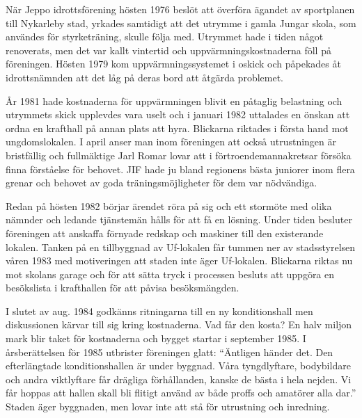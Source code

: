%



%
När Jeppo idrottsförening hösten 1976 beslöt att överföra ägandet av sportplanen till Nykarleby stad, yrkades samtidigt att det utrymme i gamla Jungar skola, som användes för styrketräning, skulle följa med. Utrymmet hade i tiden något renoverats, men det var kallt vintertid och uppvärmningskostnaderna föll på föreningen. Hösten 1979 kom uppvärmningssystemet i oskick och påpekades åt idrottsnämnden att det låg på deras bord att åtgärda problemet.

År 1981 hade kostnaderna för uppvärmningen blivit en påtaglig belastning och utrymmets skick upplevdes vara uselt och i januari 1982 uttalades en önskan att ordna en krafthall på annan plats att hyra. Blickarna riktades i första hand mot ungdomslokalen. I april anser man inom föreningen att också utrustningen är bristfällig och fullmäktige Jarl Romar lovar att i förtroendemannakretsar försöka finna förståelse för behovet. JIF hade ju bland regionens bästa juniorer inom flera grenar och behovet av goda träningsmöjligheter för dem var nödvändiga.

Redan på hösten 1982 börjar ärendet röra på sig och ett stormöte med olika nämnder och ledande tjänstemän hålls för att få en lösning. Under tiden besluter föreningen att anskaffa förnyade redskap och maskiner till den existerande lokalen. Tanken på en tillbyggnad av Uf-lokalen får tummen ner av stadsstyrelsen våren 1983 med motiveringen att staden inte äger Uf-lokalen. Blickarna riktas nu mot skolans garage och för att sätta tryck i processen besluts att uppgöra en besökslista i krafthallen för att påvisa besöksmängden.

I slutet av aug. 1984 godkänns ritningarna till en ny konditionshall men diskussionen kärvar till sig kring kostnaderna. Vad får den kosta? En halv miljon mark blir taket för kostnaderna och bygget startar i september 1985. I årsberättelsen för 1985 utbrister föreningen glatt: ``Äntligen händer det. Den efterlängtade konditionshallen är under byggnad. Våra tyngdlyftare, bodybildare och andra viktlyftare får drägliga förhållanden, kanske de bästa i hela nejden. Vi får hoppas att hallen skall bli flitigt använd av både proffs och amatörer alla dar.'' Staden äger byggnaden, men lovar inte att stå för utrustning och inredning.


